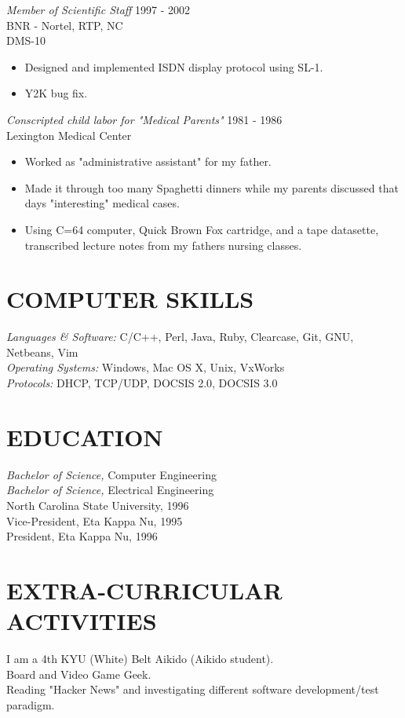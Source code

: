 \documentclass[line,margin]{res}
\begin{document}
\begin{resume}
                {\sl Member of Scientific Staff} \hfill 1997 - 2002 \\
                BNR - Nortel, RTP, NC \\
                DMS-10
                 \begin{itemize}  \itemsep -2pt %
                 \item Designed and implemented ISDN display protocol using SL-1.
                 \item Y2K bug fix.
                 \end{itemize}

                {\sl Conscripted child labor for "Medical Parents"} \hfill 1981 - 1986 \\
                Lexington Medical Center 
                 \begin{itemize}  \itemsep -2pt %
                 \item Worked as "administrative assistant" for my father.
                 \item Made it through too many Spaghetti dinners while my parents discussed that days "interesting" medical cases.
                 \item Using C=64 computer, Quick Brown Fox cartridge, and a tape datasette, transcribed lecture notes from my fathers nursing classes.
                 \end{itemize}
 
\section{COMPUTER SKILLS} {\sl Languages \& Software:} C/C++, Perl, Java,
                Ruby, Clearcase, Git, GNU, Netbeans, Vim \\
                {\sl Operating Systems:} Windows, Mac OS X, Unix, VxWorks \\ 
                {\sl Protocols:} DHCP, TCP/UDP, DOCSIS 2.0, DOCSIS 3.0
 
\section{EDUCATION} {\sl Bachelor of Science,} Computer Engineering \\
                    {\sl Bachelor of Science,} Electrical Engineering \\
                North Carolina State University, 1996 \\
                Vice-President, Eta Kappa Nu, 1995 \\ 
                President, Eta Kappa Nu, 1996 \\
 
\section{EXTRA-CURRICULAR ACTIVITIES}             
             I am a 4th KYU (White) Belt Aikido (Aikido student). \\
             Board and Video Game Geek. \\
             Reading "Hacker News" and investigating different software development/test paradigm.

\end{resume}
\end{document}
